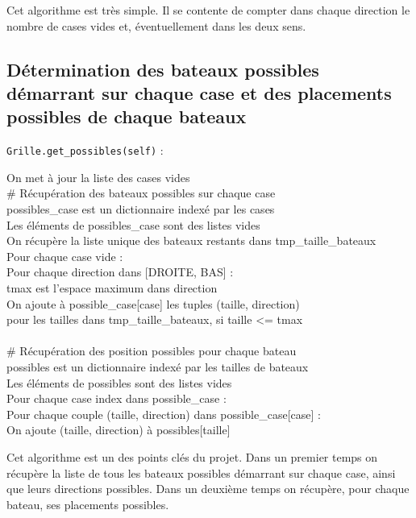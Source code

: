 Cet algorithme est très simple. Il se contente de compter dans chaque direction le nombre de cases vides et, éventuellement dans les deux sens.

\newpage

\subsection{Détermination des bateaux possibles démarrant sur chaque case et des placements possibles de chaque bateaux}\label{get_possibles}
\texttt{Grille.get\_possibles(self)} :
\begin{algo1}
On met à jour la liste des cases vides\\
\# Récupération des bateaux possibles sur chaque case\\
possibles\_case est un dictionnaire indexé par les cases\\
Les éléments de possibles\_case sont des listes vides\\
On récupère la liste unique des bateaux restants dans tmp\_taille\_bateaux\\
Pour chaque case vide :\\
Pour chaque direction dans [DROITE, BAS] :\\
tmax est l'espace maximum dans direction\\
On ajoute à possible\_case[case] les tuples (taille, direction)\\
pour les tailles dans tmp\_taille\_bateaux, si taille <= tmax\\
\ \\
\# Récupération des position possibles pour chaque bateau\\
possibles est un dictionnaire indexé par les tailles de bateaux\\
Les éléments de possibles sont des listes vides\\
Pour chaque case index dans possible\_case :\\
Pour chaque couple (taille, direction) dans possible\_case[case] :\\
On ajoute (taille, direction) à possibles[taille]\\ 
\end{algo1}

Cet algorithme est un des points clés du projet. Dans un premier temps on récupère la liste de tous les bateaux possibles démarrant sur chaque case, ainsi que leurs directions possibles. Dans un deuxième temps on récupère, pour chaque bateau, ses placements possibles. 


